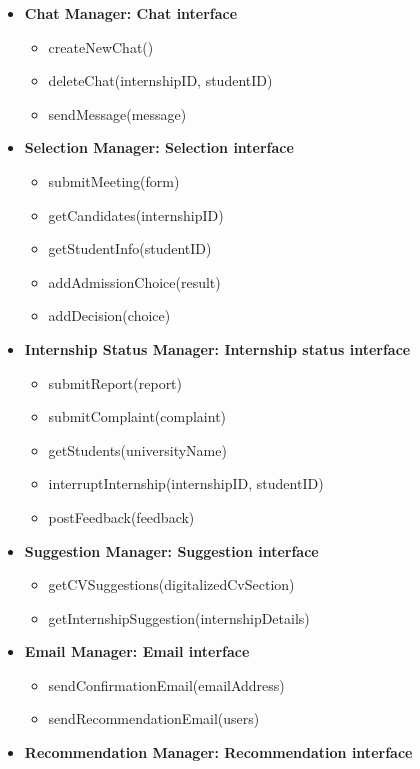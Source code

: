 \begin{itemize}
    \item \textbf{Chat Manager: Chat interface}
    \begin{itemize}
        \item createNewChat()
        \item deleteChat(internshipID, studentID)
        \item sendMessage(message)
    \end{itemize}
    \item \textbf{Selection Manager: Selection interface}
    \begin{itemize}
        \item submitMeeting(form)
        \item getCandidates(internshipID)
        \item getStudentInfo(studentID)
        \item addAdmissionChoice(result)
        \item addDecision(choice)
    \end{itemize}
    \item \textbf{Internship Status Manager: Internship status interface}
    \begin{itemize}
        \item submitReport(report)
        \item submitComplaint(complaint)
        \item getStudents(universityName)
        \item interruptInternship(internshipID, studentID)
        \item postFeedback(feedback)
    \end{itemize}
    \item \textbf{Suggestion Manager: Suggestion interface}
    \begin{itemize}
        \item getCVSuggestions(digitalizedCvSection)
        \item getInternshipSuggestion(internshipDetails)
    \end{itemize}
    \item \textbf{Email Manager: Email interface}
    \begin{itemize}
        \item sendConfirmationEmail(emailAddress)
        \item sendRecommendationEmail(users)
    \end{itemize}
    \item \textbf{Recommendation Manager: Recommendation interface}
    \begin{itemize}

\end{itemize}
\end{itemize}
